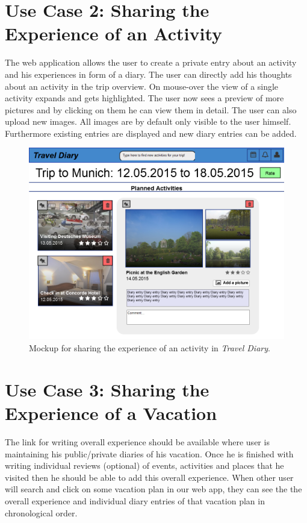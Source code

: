 \documentclass[IN,english]{tumbook}
\begin{document}
\newpage

\chapter{Use Case 2: Sharing the Experience of an Activity}

The web application allows the user to create a private entry about an activity and his experiences in form of a diary. The user can directly add his thoughts about an activity in the trip overview. On mouse-over the view of a single activity expands and gets highlighted. The user now sees a preview of more pictures and by clicking on them he can view them in detail. The user can also upload new images. All images are by default only visible to the user himself. Furthermore existing entries are displayed and new diary entries can be added.

\begin{figure}[h]
	\begin{center}
		\includegraphics[width=\textwidth]{graphics/usecase2}
	\end{center}
	\label{fig:usecase2}
	\caption{Mockup for sharing the experience of an activity in \emph{Travel Diary}.}
\end{figure}

\newpage

\chapter{Use Case 3: Sharing the Experience of a Vacation}

The link for writing overall experience should be available where user is maintaining his public/private diaries of his vacation. Once he is finished with writing individual reviews (optional) of events, activities and places that he visited then he should be able to add this overall experience. When other user will search and click on some vacation plan in our web app, they can see the the overall experience and individual diary entries of that vacation plan in chronological order.
\end{document}
